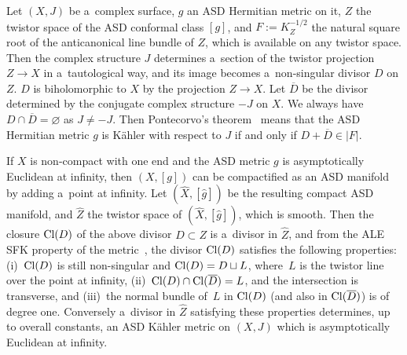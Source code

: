 \documentclass[11pt]{article}
\numberwithin{equation}{section}
\begin{document}
Let $(X,J)$ be a~complex surface, $g$ an ASD Hermitian metric on it, $Z$ the twistor space of the ASD conformal class
$[g]$, and $F:=K_Z^{-1/2}$ the natural square root of the anticanonical line bundle of $Z$, which is available on any
twistor space.
Then the complex structure $J$ determines a~section of the twistor projection $Z\to X$ in a~tautological way, and its
image becomes a~non-singular divisor $D$ on $Z$.
$D$ is biholomorphic to $X$ by the projection $Z\to X$.
Let $\overline D$ be the divisor determined by the conjugate complex structure $-J$ on $X$.
We always have $D\cap \overline D=\varnothing$ as $J\neq -J$.
Then Pontecorvo's theorem~\cite{Pont92} means that the ASD Hermitian metric $g$ is K\"ahler with respect to $J$ if and
only if $D + \overline D\in |F|$.

If $X$ is non-compact with one end and the ASD metric $g$ is asymptotically Euclidean at inf\/inity, then $(X,[g])$ can
be compactif\/ied as an ASD manifold by adding a~point at inf\/inity.
Let $(\hat X,[\hat g])$ be the resulting compact ASD manifold, and $\hat Z$ the twistor space of $(\hat X, [\hat g])$,
which is smooth.
Then the closure ${\rm{Cl}}(D)$ of the above divisor $D\subset Z$ is a~divisor in $\hat Z$, and from the ALE SFK
property of the metric~\cite[proof of Proposition~6, p.~312]{LB92}, the divisor ${\rm{Cl}}(D)$ satisf\/ies the following
properties: (i)~${\rm{Cl}}(D)$ is still non-singular and ${\rm{Cl}}(D) = D\sqcup L$, where~$L$ is the twistor line over
the point at inf\/inity, (ii)~${\rm{Cl}}(D)\cap {\rm{Cl}}(\overline D)=L$, and the intersection is transverse, and (iii)~the normal bundle of~$L$ in ${\rm{Cl}}(D)$ (and also in ${\rm{Cl}}(\overline D)$) is of degree one.
Conversely a~divisor in $\hat Z$ satisfying these properties determines, up to overall constants, an ASD K\"ahler metric
on $(X,J)$ which is asymptotically Euclidean at inf\/inity.
\end{document}

